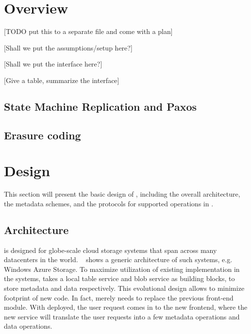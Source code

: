 \section{Overview}

[TODO put this to a separate file and come with a plan]

[Shall we put the assumptions/setup here?]

[Shall we put the interface here?]

[Give a table, summarize the interface]




\subsection{State Machine Replication and Paxos}

\subsection{Erasure coding}

\section{Design}

This section will present the basic design of {\name}, including the overall architecture,
the metadata schemes, and the protocols for supported operations in {\name}. 

\subsection{Architecture}
{\name} is designed for globe-scale cloud storage systems that span across many datacenters in
the world. ~ shows a generic architecture of such systems, e.g. Windows Azure
Storage. To maximize utilization of existing implementation in the systems, {\name} takes a local table service and
blob service as building blocks, to store metadata and data respectively. This evolutional
design allows {\name} to minimize footprint of new code. In fact, {\name} merely needs to replace the previous front-end
module. With {\name} deployed, the user request comes in to the new frontend, where the new
{\name} service will translate the user requests into a few metadata operations and data operations.

